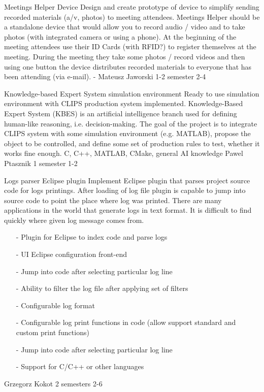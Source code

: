 \begin{project}
{Meetings Helper Device}
{Design and create prototype of device to simplify sending recorded materials
(a/v, photos) to meeting attendees.} {
Meetings Helper should be a standalone device that would allow you to record audio / video 
and to take photos (with integrated camera or using a phone). At the beginning of the meeting 
attendees use their ID Cards (with RFID?) to register themselves at the meeting. 
During the meeting they take some photos / record videos and then using one button 
the device distributes recorded materials to everyone that has been attending (via e-mail). }
{-}
{Mateusz Jaworski}
{1-2 semester}
{2-4}
\end{project}
\begin{project}
{Knowledge-based Expert System simulation environment}
{Ready to use simulation environment with CLIPS production system implemented.}
{
Knowledge-Based Expert System (KBES) is an artificial intelligence branch used for defining human-like reasoning, i.e. decision-making. The goal of the project is to integrate CLIPS system with some simulation environment (e.g. MATLAB), propose the object to be controlled, and define some set of production rules to test, whether it works fine enough. }
{C, C++, MATLAB, CMake, general AI knowledge}
{Pawel Ptasznik}
{1 semester}
{1-2}
\end{project}
\begin{project}
{Logs parser Eclipse plugin}
{
Implement Eclipse plugin that parses project source code for logs printings.
After loading of log file plugin is capable to jump into source code to point
the place where log was printed.
There are many applications in the world that generate logs in text format. It is difficult to find quickly where given log message comes from. 
}
{
 \begin{itemize}
  \item[-] Plugin for Eclipse to index code and parse logs
  \item[-] UI Eclipse configuration front-end
  \item[-] Jump into code after selecting particular log line
  \item[-] Ability to filter the log file after applying set of filters
\end{itemize}
}
{
 \begin{itemize}
  \item[-] Configurable log format
  \item[-] Configurable log print functions in code (allow support standard and custom print functions)
  \item[-] Jump into code after selecting particular log line
  \item[-] Support for C/C++ or other languages
\end{itemize}
}
{Grzegorz Kokot}
{2 semesters}
{2-6}
\end{project}
